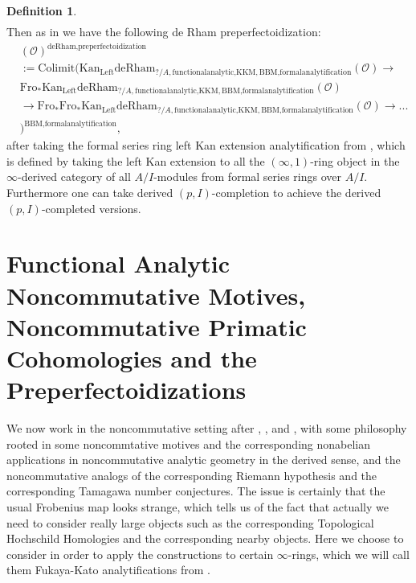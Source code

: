 \documentclass[11pt]{book}
\theoremstyle{definition}
\newtheorem{definition}[theorem]{Definition}
\numberwithin{equation}{section}
\begin{document}
\begin{definition}
\begin{align}
\end{align}	
Then as in \cite[Definition 8.2]{12BS} we have the following de Rham  preperfectoidization:
\begin{align}
&(\mathcal{O})^{\text{deRham,preperfectoidization}}\\
&:=\mathrm{Colimit}(\mathrm{Kan}_{\mathrm{Left}}\mathrm{deRham}_{?/A,\text{functionalanalytic,KKM},\text{BBM,formalanalytification}}(\mathcal{O})\rightarrow \\
&\mathrm{Fro}_*\mathrm{Kan}_{\mathrm{Left}}\mathrm{deRham}_{?/A,\text{functionalanalytic,KKM},\text{BBM,formalanalytification}}(\mathcal{O})\\
&\rightarrow \mathrm{Fro}_* \mathrm{Fro}_*\mathrm{Kan}_{\mathrm{Left}}\mathrm{deRham}_{?/A,\text{functionalanalytic,KKM},\text{BBM,formalanalytification}}(\mathcal{O})\rightarrow...\\
&)^{\text{BBM,formalanalytification}},	
\end{align}
after taking the formal series ring left Kan extension analytification from \cite[Section 4.2]{BBM}, which is defined by taking the left Kan extension to all the $(\infty,1)$-ring object in the $\infty$-derived category of all $A/I$-modules from formal series rings over $A/I$. 
Furthermore one can take derived $(p,I)$-completion to achieve the derived $(p,I)$-completed versions.


\end{definition}




\newpage

\section{Functional Analytic Noncommutative Motives, Noncommutative Primatic Cohomologies and the Preperfectoidizations}

\indent We now work in the noncommutative setting after \cite{Kon1}, \cite{Ta}, \cite{KR1} and \cite{KR2}, with some philosophy rooted in some noncommtative motives and the corresponding nonabelian applications in noncommutative analytic geometry in the derived sense, and the noncommutative analogs of the corresponding Riemann hypothesis and the corresponding Tamagawa number conjectures. The issue is certainly that the usual Frobenius map looks strange, which tells us of the fact that actually we need to consider really large objects such as the corresponding Topological Hochschild Homologies and the corresponding nearby objects. Here we choose to consider \cite{12NS} in order to apply the constructions to certain $\infty$-rings, which we will call them Fukaya-Kato analytifications from \cite{12FK}. \\
\end{document}
